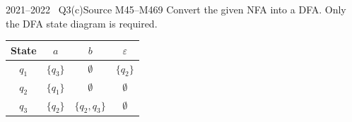 \documentclass[11pt,a4paper]{article}
\newcommand{\eps}{\varepsilon}
\begin{document}
\begin{question}{2021--2022 \textbullet\ Q3(c)}{Source M45--M46}{9}
Convert the given NFA into a DFA. Only the DFA state diagram is required.
\begin{center}\small\begin{tabular}{c|ccc}\toprule State&$a$&$b$&$\eps$\\\midrule $q_1$&$\{q_3\}$&$\emptyset$&$\{q_2\}$\\ $q_2$&$\{q_1\}$&$\emptyset$&$\emptyset$\\ $q_3$&$\{q_2\}$&$\{q_2,q_3\}$&$\emptyset$\\\bottomrule\end{tabular}\end{center}
\end{question}
\end{document}
